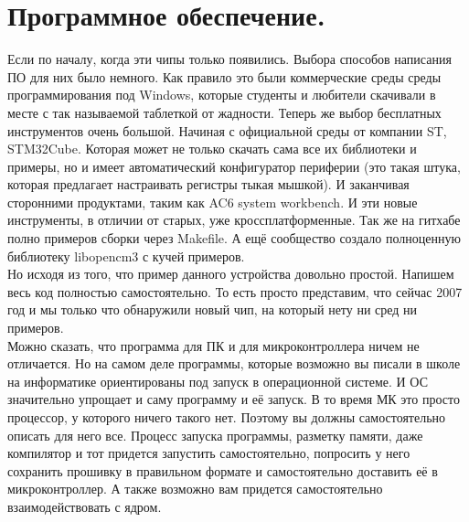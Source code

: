 \documentclass[12pt,a4paper]{article}
\begin{document}
\section{Программное обеспечение.}
    Если по началу, когда эти чипы только появились. Выбора способов написания
    ПО для них было немного. Как правило это были коммерческие среды
    среды программирования под Windows, которые студенты и любители скачивали
    в месте с так называемой таблеткой от жадности. Теперь же выбор
    бесплатных инструментов очень большой. Начиная с официальной среды от
    компании ST, STM32Cube. Которая может не только скачать сама все их
    библиотеки и примеры, но и имеет автоматический конфигуратор периферии (это
    такая штука, которая предлагает настраивать регистры тыкая мышкой).
    И заканчивая сторонними продуктами, таким как AC6 system workbench.
    И эти новые инструменты, в отличии от старых, уже кроссплатформенные.
    Так же на гитхабе полно примеров сборки через Makefile.
    А ещё сообщество создало полноценную библиотеку libopencm3 с кучей
    примеров.\\
    Но исходя из того, что пример данного устройства довольно простой. Напишем
    весь код полностью самостоятельно. То есть просто представим, что сейчас
    2007 год и мы только что обнаружили новый чип, на который нету ни сред ни
    примеров.\\
    Можно сказать, что программа для ПК и для микроконтроллера ничем не
    отличается. Но на самом деле программы, которые возможно вы писали в школе
    на информатике ориентированы под запуск в операционной системе. И ОС
    значительно упрощает и саму программу и её запуск. В то время
    МК это просто процессор, у которого ничего такого нет. Поэтому вы должны
    самостоятельно описать для него все. Процесс запуска программы, разметку
    памяти, даже компилятор и тот придется запустить самостоятельно, попросить
    у него сохранить прошивку в правильном формате и самостоятельно доставить
    её в микроконтроллер. А также возможно вам придется самостоятельно
    взаимодействовать с ядром.
\end{document}
